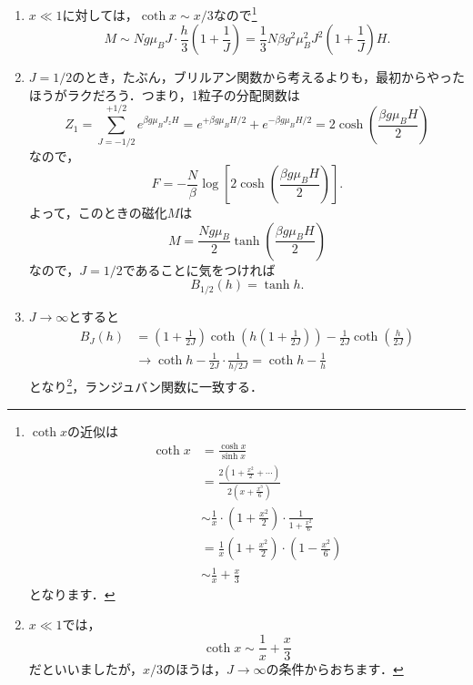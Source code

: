 \documentclass[a4paper,pdflatex,ja=standard]{bxjsarticle}
\begin{document}
\begin{enumerate}
  \item 
  $x\ll 1$に対しては，$\coth x\sim x/3$なので\footnote{
    $\coth x$の近似は
    \begin{align}
      \coth x
      &=
      \frac{\cosh x}{\sinh x}
      \nonumber
      \\
      &=
      \frac{2\left( 1+\frac{x^2}{2}+\cdots \right)}{2\left( x+\frac{x^3}{6} \right)}
      \nonumber
      \\
      &\sim
      \frac{1}{x}
      \cdot
      \left( 1+\frac{x^2}{2} \right)
      \cdot
      \frac{1}{1+\frac{x^2}{6}}
      \nonumber
      \\
      &=
      \frac{1}{x}
      \left( 1+\frac{x^2}{2} \right)
      \cdot
      \left( 1-\frac{x^2}{6} \right)
      \nonumber
      \\
      &\sim
      \frac{1}{x}
      +
      \frac{x}{3}
      \nonumber
    \end{align}
    となります．
  }
  \begin{equation}
    M
    \sim
    Ng\mu_B J
    \cdot
    \frac{h}{3}\left( 1+\frac{1}{J} \right)
    =
    \frac{1}{3}
    N\beta g^2\mu_B^2 J^2 \left( 1+\frac{1}{J} \right)H
    .
  \end{equation}

  \item 
  $J=1/2$のとき，たぶん，ブリルアン関数から考えるよりも，最初からやったほうがラクだろう．つまり，1粒子の分配関数は
  \begin{equation}
    Z_1
    =
    \sum_{J=-1/2}^{+1/2}e^{\beta g\mu_B J_z H}
    =
    e^{+\beta g\mu_B H/2}
    +
    e^{-\beta g\mu_B H/2}
    =
    2\cosh\left( \frac{\beta g\mu_B H}{2} \right)
  \end{equation}
  なので，
  \begin{equation}
    F
    =
    -
    \frac{N}{\beta}
    \log
    \left[  
      2\cosh\left( \frac{\beta g\mu_B H}{2} \right)
    \right]
    .
  \end{equation}
  よって，このときの磁化$M$は
  \begin{equation}
    M
    =
    \frac{Ng\mu_B}{2}
    \tanh\left( \frac{\beta g\mu_B H}{2} \right)
  \end{equation}
  なので，$J=1/2$であることに気をつければ
  \begin{equation}
    B_{1/2}(h)
    =
    \tanh h
    .
  \end{equation}

  \item 
  $J\rightarrow\infty$とすると
  \begin{align}
    B_J (h)
    &=
    \left( 1+\frac{1}{2J} \right)
    \coth\left(  h \left( 1+\frac{1}{2J} \right)\right)
    -
    \frac{1}{2J}
    \coth
    \left(  
        \frac{h}{2J}
    \right)
    \nonumber
    \\
    &\rightarrow
    \coth h
    -
    \frac{1}{2J}
    \cdot
    \frac{1}{h/2J}
    =
    \coth h
    -
    \frac{1}{h}
  \end{align}
  となり\footnote{
    $x\ll 1$では，
    $$\coth x\sim\frac{1}{x}+\frac{x}{3}$$
    だといいましたが，$x/3$のほうは，$J\rightarrow\infty$の条件からおちます．
  }，ランジュバン関数に一致する．


\end{enumerate}
\end{document}

